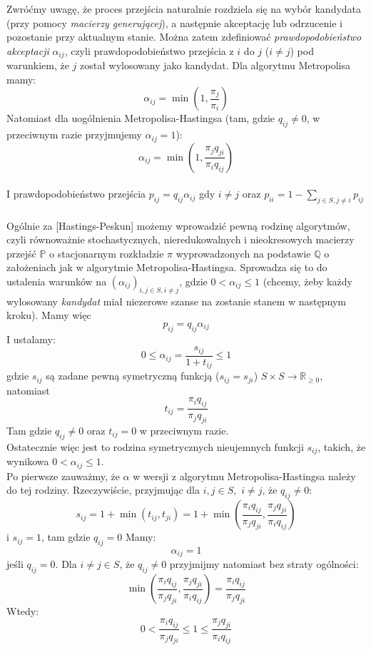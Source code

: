 \documentclass[a4paper]{article}
\begin{document}
Zwróćmy uwagę, że proces przejścia naturalnie rozdziela się na wybór kandydata (przy pomocy \textit{macierzy generującej}), a następnie akceptację lub odrzucenie i pozostanie przy aktualnym stanie. Można zatem zdefiniować \textit{prawdopodobieństwo akceptacji} $\alpha_{ij}$, czyli prawdopodobieństwo przejścia z $i$ do $j$ ($i \neq j$) pod warunkiem, że $j$ został wylosowany jako kandydat. Dla algorytmu Metropolisa mamy:
$$\alpha_{ij} = \min(1, \frac{\pi_j}{\pi_i})$$
Natomiast dla uogólnienia Metropolisa-Hastingsa (tam, gdzie $q_{ij} \neq 0$, w przeciwnym razie przyjmujemy $\alpha_{ij} = 1$):
$$\alpha_{ij} = \min(1, \frac{\pi_j q_{ji}}{\pi_i q_{ij}})$$
\\
I prawdopodobieństwo przejścia $p_{ij} = q_{ij}\alpha_{ij}$ gdy $i \neq j$ oraz $p_{ii} = 1 - \sum\limits_{j \in S, j \neq i} p_{ij}$\\\\
Ogólnie za [Hastings-Peskun] możemy wprowadzić pewną rodzinę algorytmów, czyli równoważnie stochastycznych, nieredukowalnych i nieokresowych macierzy przejść $\mathbb{P}$ o stacjonarnym rozkładzie $\pi$ wyprowadzonych na podstawie $\mathbb{Q}$ o założeniach jak w algorytmie Metropolisa-Hastingsa. Sprowadza się to do ustalenia warunków na $(\alpha_{ij})_{i,j \in S, i \neq j}$, gdzie $0 < \alpha_{ij} \leq 1$ (chcemy, żeby każdy wylosowany \textit{kandydat} miał niezerowe szanse na zostanie stanem w następnym kroku). Mamy więc  $$p_{ij} = q_{ij}\alpha_{ij}$$
I ustalamy:
$$ 0 \leq \alpha_{ij} = \frac{s_{ij}}{1+t_{ij}} \leq 1$$
gdzie  $s_{ij}$ są zadane pewną symetryczną funkcją ($s_{ij} = s_{ji}$) $S \times S \to \mathbb{R}_{\geq 0}$, natomiast $$t_{ij} = \frac{\pi_i q_{ij}}{\pi_j q_{ji}}$$
Tam gdzie $q_{ij} \neq 0$ oraz $t_{ij} = 0$ w przeciwnym razie.\\
Ostatecznie więc jest to rodzina symetrycznych nieujemnych funkcji $s_{ij}$, takich, że wynikowa $0 < \alpha_{ij} \leq 1$.\\
Po pierwsze zauważmy, że $\alpha$ w wersji z algorytmu Metropolisa-Hastingsa należy do tej rodziny. Rzeczywiście, przyjmując dla $i,j \in S,\,\, i \neq j$, że $q_{ij} \neq 0$:
$$s_{ij} = 1 + \min(t_{ij}, t_{ji}) = 1 + \min\left(\frac{\pi_i q_{ij}}{\pi_j q_{ji}}, \frac{\pi_j q_{ji}}{\pi_i q_{ij}}\right)$$
i $s_{ij} = 1$, tam gdzie $q_{ij} = 0$ 
Mamy:
$$\alpha_{ij} = 1$$
jeśli $q_{ij} = 0$. Dla $i \neq j \in S$, że $q_{ij} \neq 0$ przyjmijmy natomiast bez straty ogólności:
$$\min\left(\frac{\pi_i q_{ij}}{\pi_j q_{ji}}, \frac{\pi_j q_{ji}}{\pi_i q_{ij}}\right) = \frac{\pi_i q_{ij}}{\pi_j q_{ji}}$$
Wtedy:
$$0 < \frac{\pi_i q_{ij}}{\pi_j q_{ji}} \leq 1 \leq \frac{\pi_j q_{ji}}{\pi_i q_{ij}}$$
\end{document}
